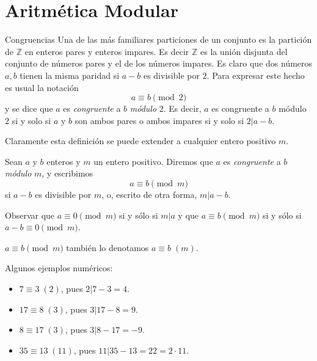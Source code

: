 \chapter[Aritmética Modular]{Aritmética Modular}\label{cap.aritmetica_modular}

\begin{section}{Congruencias}\label{seccion-congruencias}
Una de las más familiares particiones de un conjunto es la partición de $\mathbb Z$ en enteros pares y enteros impares. Es decir $\mathbb Z$ es la unión disjunta del conjunto de números pares y el de los números impares. Es claro que dos números $a,b$ tienen la misma paridad si $a-b$ es divisible por $2$. Para expresar este hecho es usual la notación
$$
a\equiv b \pmod2
$$
y se dice que $a$ es \textit{congruente } a $b$ \textit{módulo} $2$. Es decir, $a$ es congruente a $b$ módulo $2$ si y solo si $a$ y $b$ son ambos pares o ambos impares si y solo si $2|a-b$.

Claramente esta definición se puede extender a cualquier entero positivo $m$.

\begin{definicion} Sean $a$ y $b$ enteros y $m$ un entero positivo. Diremos que $a$ es {\em congruente} a $b$  {\em módulo} $m$, y escribimos  
$$
a \equiv b \pmod{m}
$$
si $a-b$ es divisible por $m$, o, escrito de otra forma,  $m|a-b$.
\end{definicion}

Observar que $a\equiv 0 \pmod{m}$ si  y sólo si $m|a$ y que $a\equiv b \pmod{m}$ si y sólo si $a-b\equiv 0 \pmod{m}$. 

\begin{notacion*}
    $a \equiv b \pmod{m}$ también  lo denotamos $a \equiv b\; (m)$.

\end{notacion*}

\begin{ejemplo*} Algunos ejemplos  numéricos:
    \begin{itemize}
        \item $7 \equiv 3 \;(2)$, pues $2 | 7-3=4$.
        \item $17 \equiv 8 \;(3)$, pues $3 | 17-8 =9$.  
        \item $8 \equiv 17 \;(3)$, pues $3 | 8-17 =-9$.
        \item $35 \equiv 13 \;(11)$, pues $11| 35-13 = 22 = 2 \cdot 11$. 
    \end{itemize}
\end{ejemplo*}



\end{section}
